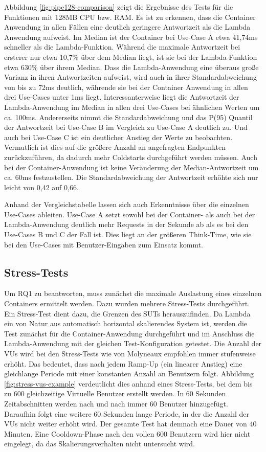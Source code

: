 Abbildung \ref{fig:pipe128-comparison} zeigt die Ergebnisse des Tests für die Funktionen mit 128MB CPU bzw. RAM. Es ist zu erkennen, dass die Container Anwendung in allen Fällen eine deutlich geringere Antwortzeit als die Lambda Anwendung aufweist. Im Median ist der Container bei Use-Case A etwa 41,74ms schneller als die Lambda-Funktion. Während die maximale Antwortzeit bei ersterer nur etwa 10,7\% über dem Median liegt, ist sie bei der Lambda-Funktion etwa 630\% über ihrem Median. Dass die Lambda-Anwendung eine überaus große Varianz in ihren Antwortzeiten aufweist, wird auch in ihrer Standardabweichung von bis zu 72ms deutlich, währende sie bei der Container Anwendung in allen drei Use-Cases unter 1ms liegt. Interessanterweise liegt die Antwortzeit der Lambda-Anwendung im Median in allen drei Use-Cases bei ähnlichen Werten um ca. 100ms. Andererseits nimmt die Standardabweichung und das P(95) Quantil der Antwortzeit bei Use-Case B im Vergleich zu Use-Case A deutlich zu. Und auch bei Use-Case C ist ein deutlicher Anstieg der Werte zu beobachten. Vermutlich ist dies auf die größere Anzahl an angefragten Endpunkten zurückzuführen, da dadurch mehr Coldstarts durchgeführt werden müssen. Auch bei der Container-Anwendung ist keine Veränderung der Median-Antwortzeit um ca. 60ms festzustellen. Die Standardabweichung der Antwortzeit erhöhte sich nur leicht von 0,42 auf 0,66.

Anhand der Vergleichstabelle lassen sich auch Erkenntnisse über die einzelnen Use-Cases ableiten. Use-Case A setzt sowohl bei der Container- als auch bei der Lambda-Anwendung deutlich mehr Requests in der Sekunde ab als es bei den Use-Cases B und C der Fall ist. Dies liegt an der größeren Think-Time, wie sie bei den Use-Cases mit Benutzer-Eingaben zum Einsatz kommt.

\subsection{Stress-Tests}
Um RQ1 zu beantworten, muss zunächst die maximale Auslastung eines einzelnen Containers ermittelt werden. Dazu wurden mehrere Stress-Tests durchgeführt. Ein Stress-Test dient dazu, die Grenzen des SUTs herauszufinden. Da Lambda ein von Natur aus automatisch horizontal skalierendes System ist, werden die Test zunächst für die Container-Anwendung durchgeführt und im Anschluss die Lambda-Anwendung mit der gleichen Test-Konfiguration getestet. Die Anzahl der VUs wird bei den Stress-Tests wie von Molyneaux\cite{molyneaux_art_2014} empfohlen immer stufenweise erhöht. Das bedeutet, dass nach jedem Ramp-Up (ein linearer Anstieg) eine gleichlange Periode mit einer konstanten Anzahl an Benutzern folgt. Abbildung \ref{fig:stress-vus-example} verdeutlicht dies anhand eines Stress-Tests, bei dem bis zu 600 gleichzeitige Virtuelle Benutzer erstellt werden. In 60 Sekunden Zeitabschnitten werden nach und nach immer 60 Benutzer hinzugefügt. Daraufhin folgt eine weitere 60 Sekunden lange Periode, in der die Anzahl der VUs nicht weiter erhöht wird. Der gesamte Test hat demnach eine Dauer von 40 Minuten. Eine Cooldown-Phase nach den vollen 600 Benutzern wird hier nicht eingelegt, da das Skalierungsverhalten nicht untersucht wird.

